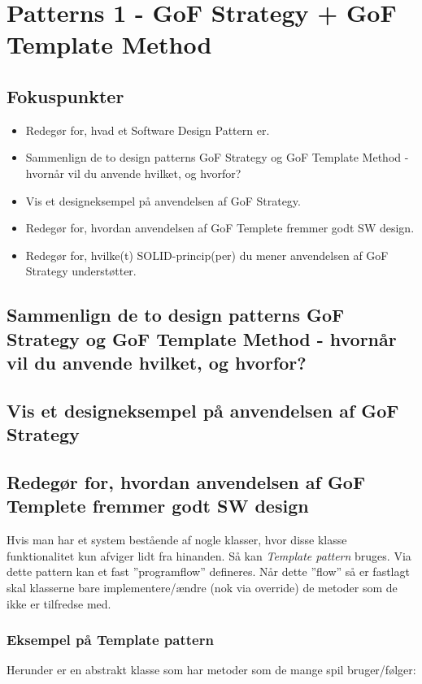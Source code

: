 \section{Patterns 1 - GoF Strategy + GoF Template Method}

\subsection{Fokuspunkter}

\begin{itemize}
	\item Redegør for, hvad et Software Design Pattern er.
	\item Sammenlign de to design patterns GoF Strategy og GoF Template Method - hvornår vil du anvende hvilket, og hvorfor?
	\item Vis et designeksempel på anvendelsen af GoF Strategy.
	\item Redegør for, hvordan anvendelsen af GoF Templete fremmer godt SW design.
	\item Redegør for, hvilke(t) SOLID-princip(per) du mener anvendelsen af GoF Strategy understøtter.
\end{itemize}



\subsection{Sammenlign de to design patterns GoF Strategy og GoF Template Method - hvornår vil du anvende hvilket, og hvorfor?}

\subsection{Vis et designeksempel på anvendelsen af GoF Strategy}

\subsection{Redegør for, hvordan anvendelsen af GoF Templete fremmer godt SW design}
Hvis man har et system bestående af nogle klasser, hvor disse klasse funktionalitet kun afviger lidt fra hinanden. Så kan \textit{Template pattern} bruges. Via dette pattern kan et fast ''programflow'' defineres. Når dette ''flow'' så er fastlagt skal klasserne bare implementere/ændre (nok via override) de metoder som de ikke er tilfredse med.

\subsubsection{Eksempel på Template pattern}
Herunder er en abstrakt klasse som har metoder som de mange spil bruger/følger:

